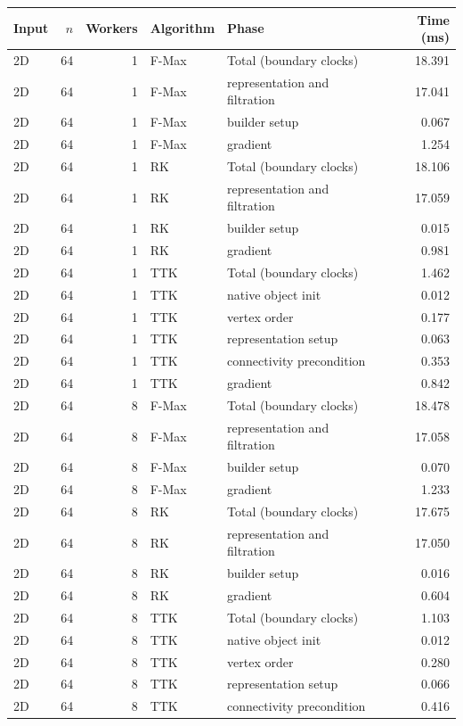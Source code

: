 \begin{tabular}{lrrllr}
\hline
Input & $n$ & Workers & Algorithm & Phase & Time (ms) \\
\hline
2D & 64 & 1 & F-Max & Total (boundary clocks) & 18.391 \\
2D & 64 & 1 & F-Max & representation and filtration & 17.041 \\
2D & 64 & 1 & F-Max & builder setup & 0.067 \\
2D & 64 & 1 & F-Max & gradient & 1.254 \\
2D & 64 & 1 & RK & Total (boundary clocks) & 18.106 \\
2D & 64 & 1 & RK & representation and filtration & 17.059 \\
2D & 64 & 1 & RK & builder setup & 0.015 \\
2D & 64 & 1 & RK & gradient & 0.981 \\
2D & 64 & 1 & TTK & Total (boundary clocks) & 1.462 \\
2D & 64 & 1 & TTK & native object init & 0.012 \\
2D & 64 & 1 & TTK & vertex order & 0.177 \\
2D & 64 & 1 & TTK & representation setup & 0.063 \\
2D & 64 & 1 & TTK & connectivity precondition & 0.353 \\
2D & 64 & 1 & TTK & gradient & 0.842 \\
2D & 64 & 8 & F-Max & Total (boundary clocks) & 18.478 \\
2D & 64 & 8 & F-Max & representation and filtration & 17.058 \\
2D & 64 & 8 & F-Max & builder setup & 0.070 \\
2D & 64 & 8 & F-Max & gradient & 1.233 \\
2D & 64 & 8 & RK & Total (boundary clocks) & 17.675 \\
2D & 64 & 8 & RK & representation and filtration & 17.050 \\
2D & 64 & 8 & RK & builder setup & 0.016 \\
2D & 64 & 8 & RK & gradient & 0.604 \\
2D & 64 & 8 & TTK & Total (boundary clocks) & 1.103 \\
2D & 64 & 8 & TTK & native object init & 0.012 \\
2D & 64 & 8 & TTK & vertex order & 0.280 \\
2D & 64 & 8 & TTK & representation setup & 0.066 \\
2D & 64 & 8 & TTK & connectivity precondition & 0.416 \\

\end{tabular}
